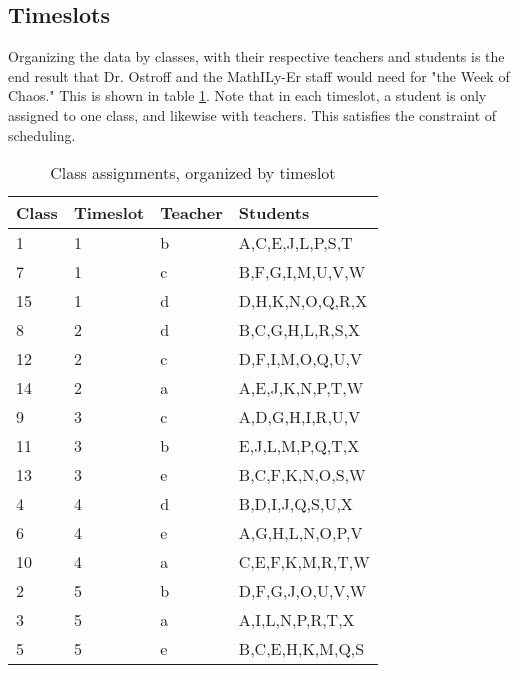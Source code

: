 \documentclass[11pt]{article}
\begin{document}
\subsection{Timeslots}
Organizing the data by classes, with their respective teachers and students is the end result that Dr. Ostroff and the MathILy-Er staff would need for "the Week of Chaos." This is shown in table \ref{table:ass}. Note that in each timeslot, a student is only assigned to one class, and likewise with teachers. This satisfies the constraint of scheduling.\\
\begin{table}[h]
\hspace*{1.5cm}
\begin{tabular}{|l|l|l|l|} \hline
\rowcolor{gray!45}
Class & Timeslot & Teacher & Students \\ \hline \hline
1 & 1 & b & A,C,E,J,L,P,S,T \\ \hline
7 & 1 & c & B,F,G,I,M,U,V,W \\ \hline
15 & 1 & d & D,H,K,N,O,Q,R,X \\ \hline
\rowcolor{gray!30}
8 & 2 & d & B,C,G,H,L,R,S,X \\ \hline
\rowcolor{gray!30}
12 & 2 & c & D,F,I,M,O,Q,U,V \\ \hline
\rowcolor{gray!30}
14 & 2 & a & A,E,J,K,N,P,T,W \\ \hline
9 & 3 & c & A,D,G,H,I,R,U,V \\ \hline
11 & 3 & b & E,J,L,M,P,Q,T,X \\ \hline
13 & 3 & e & B,C,F,K,N,O,S,W \\ \hline
\rowcolor{gray!30}
4 & 4 & d & B,D,I,J,Q,S,U,X \\ \hline
\rowcolor{gray!30}
6 & 4 & e & A,G,H,L,N,O,P,V \\ \hline
\rowcolor{gray!30}
10 & 4 & a & C,E,F,K,M,R,T,W \\ \hline
2 & 5 & b & D,F,G,J,O,U,V,W \\ \hline
3 & 5 & a & A,I,L,N,P,R,T,X \\ \hline
5 & 5 & e & B,C,E,H,K,M,Q,S \\ \hline
\end{tabular}
\caption{Class assignments, organized by timeslot}
\label{table:ass}
\end{table}
\FloatBarrier
\end{document}
